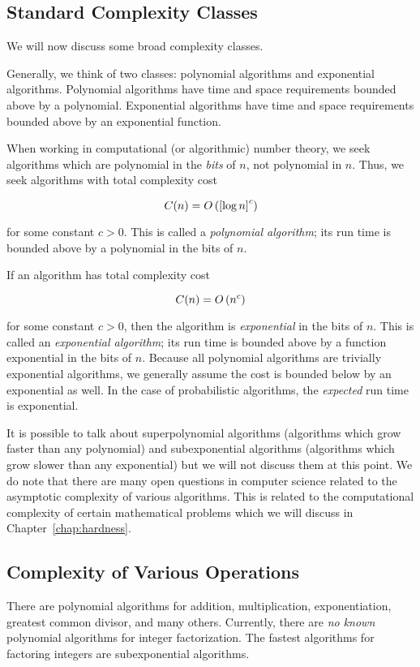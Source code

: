 \subsection{Standard Complexity Classes}

We will now discuss some broad complexity classes.

Generally, we think of two classes: polynomial algorithms
and exponential algorithms.
Polynomial algorithms have time and space requirements bounded above
by a polynomial.
Exponential algorithms have time and space requirements
bounded above by an exponential function.

When working in computational (or algorithmic) number theory,
we seek algorithms which are polynomial in the \emph{bits} of $n$,
not polynomial in $n$.
Thus, we seek algorithms with total complexity cost

\begin{equation}
    C(n) = O\left( \left[ \log n \right]^{c} \right)
\end{equation}

\noindent
for some constant $c>0$.
This is called a \emph{polynomial algorithm};
its run time is bounded above by a polynomial in the bits of $n$.

If an algorithm has total complexity cost

\begin{equation}
    C(n) = O\left( n^{c} \right)
\end{equation}

\noindent
for some constant $c>0$,
then the algorithm is \emph{exponential} in the bits of $n$.
This is called an \emph{exponential algorithm};
its run time is bounded above by a function exponential in the bits of $n$.
Because all polynomial algorithms are trivially exponential algorithms,
we generally assume the cost is bounded below by an exponential as well.
In the case of probabilistic algorithms,
the \emph{expected} run time is exponential.

It is possible to talk about superpolynomial algorithms
(algorithms which grow faster than any polynomial)
and subexponential algorithms
(algorithms which grow slower than any exponential)
but we will not discuss them at this point.
We do note that there are many open questions in computer science
related to the asymptotic complexity of various algorithms.
This is related to the computational complexity of
certain mathematical problems which we will discuss
in Chapter~\ref{chap:hardness}.

\subsection{Complexity of Various Operations}

There are polynomial algorithms for addition,
multiplication, exponentiation, greatest common divisor, and many others.
Currently, there are \emph{no known} polynomial algorithms
for integer factorization.
The fastest algorithms for factoring integers are subexponential algorithms.
